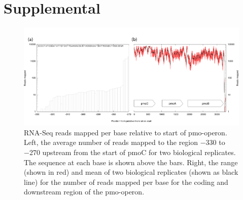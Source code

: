 \section{Supplemental}


\begin{figure}[H]
\centering
     \includegraphics[width=1.0\textwidth]{./tex/chapter1/figures/supplemental/FigureS1.png}
     \begin{singlespace}
     \caption[RNA-Seq reads mapped per base relative to start of pmo-operon.]{
        RNA-Seq reads mapped per base relative to start of pmo-operon.
        Left, the average number of reads mapped to the region −330 to −270 upstream from the start of pmoC for two biological replicates.
        The sequence at each base is shown above the bars.
        Right, the range (shown in red) and mean of two biological replicates (shown as black line) for the number of reads mapped per base for the coding and downstream region of the pmo-operon.}
     \label{fig:S1} %
     \end{singlespace}
\end{figure}

